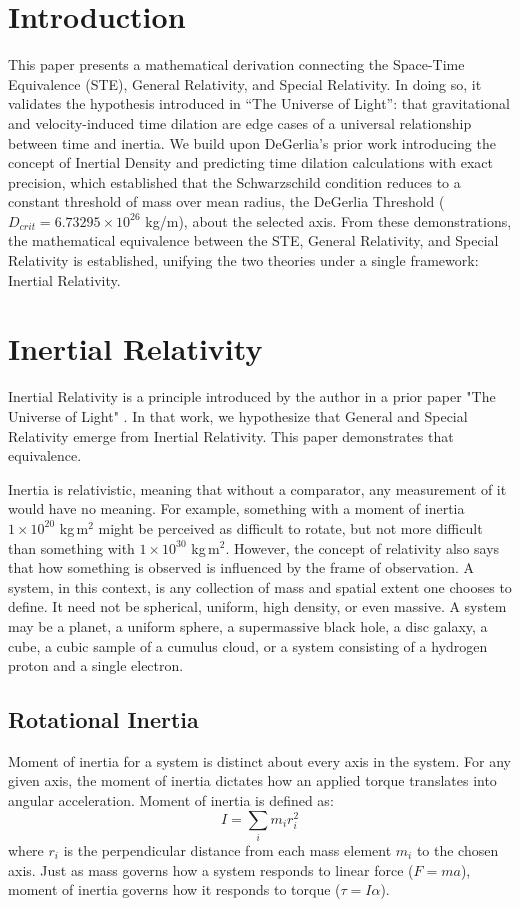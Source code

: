 \section{Introduction}
This paper presents a mathematical derivation connecting the Space-Time Equivalence (STE), General Relativity\citep{einstein1915}, and Special Relativity\citep{einstein1905}. In doing so, it validates the hypothesis introduced in ``The Universe of Light''\citep{degerlia202501}: that gravitational and velocity-induced time dilation are edge cases of a universal relationship between time and inertia. We build upon DeGerlia's prior work introducing the concept of Inertial Density and predicting time dilation calculations with exact precision\citep{degerlia202505}, which established that the Schwarzschild condition reduces to a constant threshold of mass over mean radius, the DeGerlia Threshold ($D_{crit} = 6.73295 \times 10^{26}$ kg/m), about the selected axis. From these demonstrations, the mathematical equivalence between the STE, General Relativity, and Special Relativity is established, unifying the two theories under a single framework: Inertial Relativity.

\section{Inertial Relativity}
Inertial Relativity is a principle introduced by the author in a prior paper "The Universe of Light" \citep{degerlia202501}. In that work, we hypothesize that General and Special Relativity emerge from Inertial Relativity. This paper demonstrates that equivalence.

Inertia is relativistic, meaning that without a comparator, any measurement of it would have no meaning. For example, something with a moment of inertia $1 \times 10^{20}$ kg\,m$^2$ might be perceived as difficult to rotate, but not more difficult than something with $1 \times 10^{30}$ kg\,m$^2$. However, the concept of relativity also says that how something is observed is influenced by the frame of observation.
A system, in this context, is any collection of mass and spatial extent one chooses to define. It need not be spherical, uniform, high density, or even massive. A system may be a planet, a uniform sphere, a supermassive black hole, a disc galaxy, a cube, a cubic sample of a cumulus cloud, or a system consisting of a hydrogen proton and a single electron.

\subsection{Rotational Inertia}
Moment of inertia for a system is distinct about every axis in the system. For any given axis, the moment of inertia dictates how an applied torque translates into angular acceleration. Moment of inertia is defined as:
\begin{equation} \label{eq:moi}
I = \sum_i m_i r_i^2
\end{equation}
where $r_i$ is the perpendicular distance from each mass element $m_i$ to the chosen axis. Just as mass governs how a system responds to linear force ($F = ma$), moment of inertia governs how it responds to torque ($\tau = I\alpha$).

